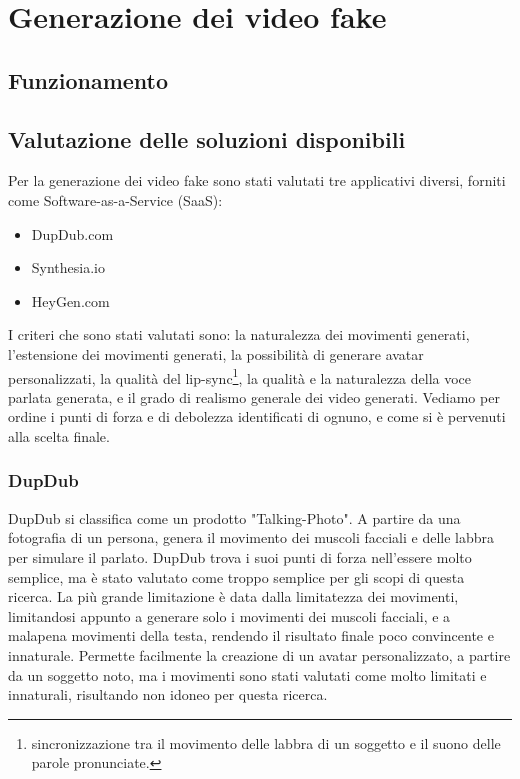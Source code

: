\chapter{Generazione dei video fake}

\section{Funzionamento}
\label{sec:funzionamento}

\section{Valutazione delle soluzioni disponibili}

Per la generazione dei video fake sono stati valutati tre applicativi diversi, forniti come Software-as-a-Service (SaaS):
\begin{itemize}
    \item DupDub.com
    \item Synthesia.io
    \item HeyGen.com
\end{itemize}

I criteri che sono stati valutati sono: la naturalezza dei movimenti generati, l'estensione dei movimenti generati, la possibilità di generare avatar personalizzati, la qualità del lip-sync\footnote{sincronizzazione tra il movimento delle labbra di un soggetto e il suono delle parole pronunciate.}, la qualità e la naturalezza della voce parlata generata, e il grado di realismo generale dei video generati. Vediamo per ordine i punti di forza e di debolezza identificati di ognuno, e come si è pervenuti alla scelta finale. 

\subsection{DupDub}

DupDub si classifica come un prodotto "Talking-Photo". A partire da una fotografia di un persona, genera il movimento dei muscoli facciali e delle labbra per simulare il parlato. DupDub trova i suoi punti di forza nell'essere molto semplice, ma è stato valutato come troppo semplice per gli scopi di questa ricerca. La più grande limitazione è data dalla limitatezza dei movimenti, limitandosi appunto a generare solo i movimenti dei muscoli facciali, e a malapena movimenti della testa, rendendo il risultato finale poco convincente e innaturale. Permette facilmente la creazione di un avatar personalizzato, a partire da un soggetto noto, ma i movimenti sono stati valutati come molto limitati e innaturali, risultando non idoneo per questa ricerca.

